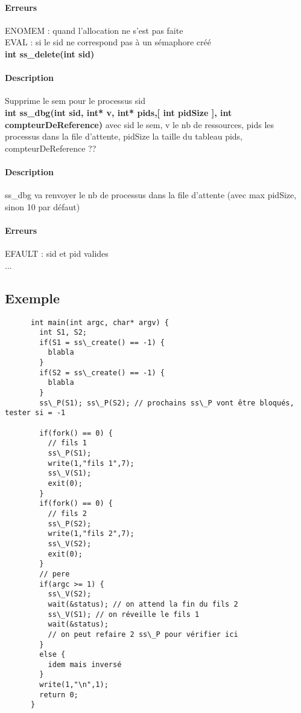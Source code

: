 \documentclass[12pt]{article}
\begin{document}
      \paragraph{Erreurs\\}
      ENOMEM : quand l'allocation ne s'est pas faite \\
      EVAL : si le sid ne correspond pas à un sémaphore créé \\

      \newpage
      \textbf{int ss\_delete(int sid)} \\
      \paragraph{Description\\}
      Supprime le sem pour le processus sid \\

      \newpage
      \textbf{int ss\_dbg(int sid, int* v, int* pids,[ int pidSize ], int compteurDeReference)} avec sid le sem, v le nb de ressources, pids les processus dans la file d'attente, pidSize la taille du tableau pids, compteurDeReference ??
      \paragraph{Description\\}
      ss\_dbg va renvoyer le nb de processus dans la file d'attente (avec max pidSize, sinon 10 par défaut)
      \paragraph{Erreurs\\}
      EFAULT : sid et pid valides \\
      ... \\

      \newpage
      \subsection{Exemple}
      \begin{lstlisting}
      int main(int argc, char* argv) {
        int S1, S2;
        if(S1 = ss\_create() == -1) {
          blabla
        }
        if(S2 = ss\_create() == -1) {
          blabla
        }
        ss\_P(S1); ss\_P(S2); // prochains ss\_P vont être bloqués, tester si = -1

        if(fork() == 0) {
          // fils 1
          ss\_P(S1);
          write(1,"fils 1",7);
          ss\_V(S1);
          exit(0);
        }
        if(fork() == 0) {
          // fils 2
          ss\_P(S2);
          write(1,"fils 2",7);
          ss\_V(S2);
          exit(0);
        }
        // pere
        if(argc >= 1) {
          ss\_V(S2);
          wait(&status); // on attend la fin du fils 2
          ss\_V(S1); // on réveille le fils 1
          wait(&status);
          // on peut refaire 2 ss\_P pour vérifier ici
        }
        else {
          idem mais inversé
        }
        write(1,"\n",1);
        return 0;
      }
      \end{lstlisting}
\end{document}
